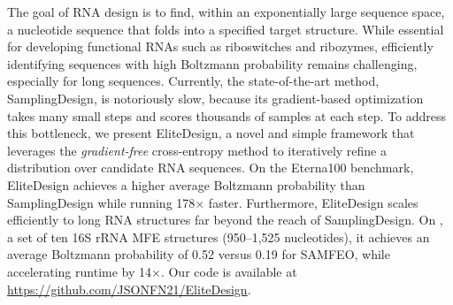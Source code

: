 The goal of RNA design is to find, within an exponentially large sequence
space, a nucleotide sequence that folds into a specified target structure.
While essential for developing functional RNAs such as riboswitches and ribozymes,
efficiently identifying sequences with high Boltzmann probability remains challenging,
especially for long sequences. Currently, the state-of-the-art method, SamplingDesign, is notoriously slow,
because its gradient-based optimization takes many small steps and scores thousands of samples at each step.
To address this bottleneck, we present EliteDesign, a novel and simple framework that leverages the
{\em gradient-free} cross-entropy method to iteratively refine a distribution over candidate RNA sequences.
On the Eterna100 benchmark, EliteDesign achieves a higher average Boltzmann probability than
SamplingDesign while running 178$\times$ faster. Furthermore, EliteDesign scales efficiently to long RNA structures
far beyond the reach of SamplingDesign. On \sixteenS{}, a set of ten 16S rRNA MFE structures (950--1,525 nucleotides),
it achieves an average Boltzmann probability of 0.52 versus 0.19 for
SAMFEO, while accelerating runtime by 14$\times$.
Our code is available at \url{https://github.com/JSONFN21/EliteDesign}.

